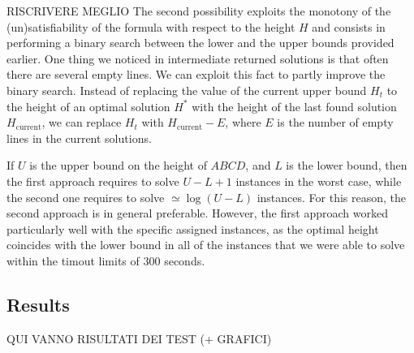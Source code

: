 \documentclass[]{article}
\begin{document}
RISCRIVERE MEGLIO The second possibility exploits the monotony of the (un)satisfiability of the formula with respect to the height $H$ and consists in performing a binary search between the lower and the upper bounds provided earlier. One thing we noticed in intermediate returned solutions is that often there are several empty lines. We can exploit this fact to partly improve the binary search. Instead of replacing the value of the current upper bound $H_t$ to the height of an optimal solution $H^*$ with the height of the last found solution $H_{\text{current}}$, we can replace $H_t$ with $H_{\text{current}}-E$, where $E$ is the number of empty lines in the current solutions.

If $U$ is the upper bound on the height of $ABCD$, and $L$ is the lower bound, then the first approach requires to solve $U-L+1$ instances in the worst case, while the second one requires to solve $\simeq \log{(U-L)}$ instances. For this reason, the second approach is in general preferable. However, the first approach worked particularly well with the specific assigned instances, as the optimal height coincides with the lower bound in all of the instances that we were able to solve within the timout limits of $300$ seconds.

\subsection{Results}
QUI VANNO RISULTATI DEI TEST (+ GRAFICI)
\end{document}
